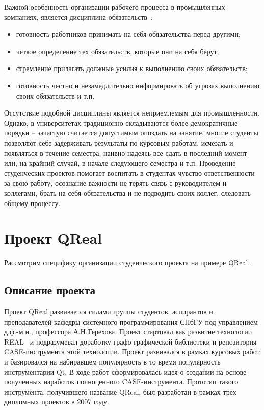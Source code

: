 \documentclass[a4paper]{article}
\begin{document}
Важной особенность организации рабочего процесса в промышленных компаниях, является дисциплина обязательств~\cite{obyzat}:
\begin{itemize}
 \item готовность работников принимать на себя обязательства перед другими;
 \item четкое определение тех обязательств, которые они на себя берут;
 \item стремление прилагать должные усилия к выполнению своих обязательств;
 \item готовность честно и незамедлительно информировать об угрозах выполнению своих обязательств и т.п.
\end{itemize}
Отсутствие подобной дисциплины является неприемлемым для промышленности. Однако, в университетах традиционно складываются более демократичные порядки -- зачастую считается допустимым опоздать на занятие, многие студенты позволяют себе задерживать результаты по курсовым работам, исчезать и появляться в течение семестра, наивно надеясь все сдать в последний момент или, на крайний случай, в начале следующего семестра и т.п. Проведение студенческих проектов помогает воспитать в студентах чувство ответственности за свою работу, осознание важности не терять связь с руководителем и коллегами, брать на себя обязательства и не подводить своих коллег, следовать общему процессу.

\section{Проект QReal}

Рассмотрим специфику организации студенческого проекта на примере QReal.

\subsection{Описание проекта}

Проект QReal развивается силами группы студентов, аспирантов и преподавателей кафедры системного программирования СПбГУ под управлением д.ф.-м.н., профессора А.Н.Терехова. Проект стартовал как развитие технологии REAL~\cite{real} и подразумевал доработку графо-графической библиотеки и репозитория CASE-инструмента этой технологии. Проект развивался в рамках курсовых работ и базировался на набиравшем популярность в то время популярность инструментарии Qt. В ходе работ сформировалась идея о создании на основе полученных наработок полноценного CASE-инструмента. Прототип такого инструмента, получившего название QReal, был разработан в рамках трех дипломных проектов в 2007 году. 
\end{document}
